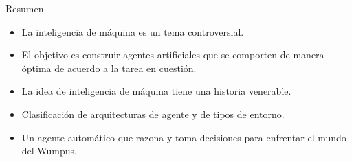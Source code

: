 \documentclass[11pt]{beamer}
\begin{document}
\begin{frame}{Resumen}

\begin{itemize}
\item La inteligencia de máquina es un tema controversial.
\item El objetivo es construir agentes artificiales que se comporten de manera óptima de acuerdo a la tarea en cuestión.
\item La idea de inteligencia de máquina tiene una historia venerable.
\item Clasificación de arquitecturas de agente y de tipos de entorno.
\item Un agente automático que razona y toma decisiones para enfrentar el mundo del Wumpus.
\end{itemize}

\end{frame}
\end{document}
